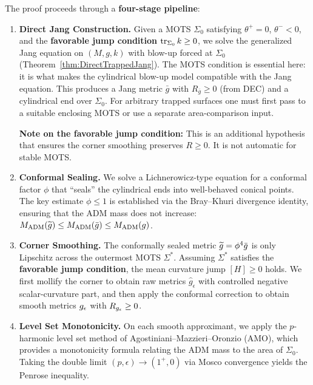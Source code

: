 The proof proceeds through a \textbf{four-stage pipeline}:
\begin{enumerate}
    \item[\textbf{Stage 1:}] \textbf{Direct Jang Construction.} Given a MOTS $\Sigma_0$ satisfying $\theta^+ = 0$, $\theta^- < 0$, and the \textbf{favorable jump condition} $\operatorname{tr}_{\Sigma_0} k \ge 0$, we solve the generalized Jang equation on $(M,g,k)$ with blow-up forced at $\Sigma_0$ (Theorem~\ref{thm:DirectTrappedJang}). The MOTS condition is essential here: it is what makes the cylindrical blow-up model compatible with the Jang equation. This produces a Jang metric $\bar{g}$ with $R_{\bar{g}} \ge 0$ (from DEC) and a cylindrical end over $\Sigma_0$. For arbitrary trapped surfaces one must first pass to a suitable enclosing MOTS or use a separate area-comparison input.
    
    \textbf{Note on the favorable jump condition:} This is an additional hypothesis that ensures the corner smoothing preserves $R \ge 0$. It is not automatic for stable MOTS.
    
    \item[\textbf{Stage 2:}] \textbf{Conformal Sealing.} We solve a Lichnerowicz-type equation for a conformal factor $\phi$ that ``seals'' the cylindrical ends into well-behaved conical points. The key estimate $\phi \le 1$ is established via the Bray--Khuri divergence identity, ensuring that the ADM mass does not increase: $M_{\mathrm{ADM}}(\widetilde{g}) \le M_{\mathrm{ADM}}(\bar{g}) \le M_{\mathrm{ADM}}(g)$.
    
    \item[\textbf{Stage 3:}] \textbf{Corner Smoothing.} The conformally sealed metric $\widetilde{g} = \phi^4 \bar{g}$ is only Lipschitz across the outermost MOTS $\Sigma^*$. Assuming $\Sigma^*$ satisfies the \textbf{favorable jump condition}, the mean curvature jump $[H] \ge 0$ holds. We first mollify the corner to obtain raw metrics $\hat{g}_\epsilon$ with controlled negative scalar-curvature part, and then apply the conformal correction to obtain smooth metrics $g_{\epsilon}$ with $R_{g_{\epsilon}} \ge 0$.
    
    \item[\textbf{Stage 4:}] \textbf{Level Set Monotonicity.} On each smooth approximant, we apply the $p$-harmonic level set method of Agostiniani--Mazzieri--Oronzio (AMO), which provides a monotonicity formula relating the ADM mass to the area of $\Sigma_0$. Taking the double limit $(p, \epsilon) \to (1^+, 0)$ via Mosco convergence yields the Penrose inequality.
\end{enumerate}

